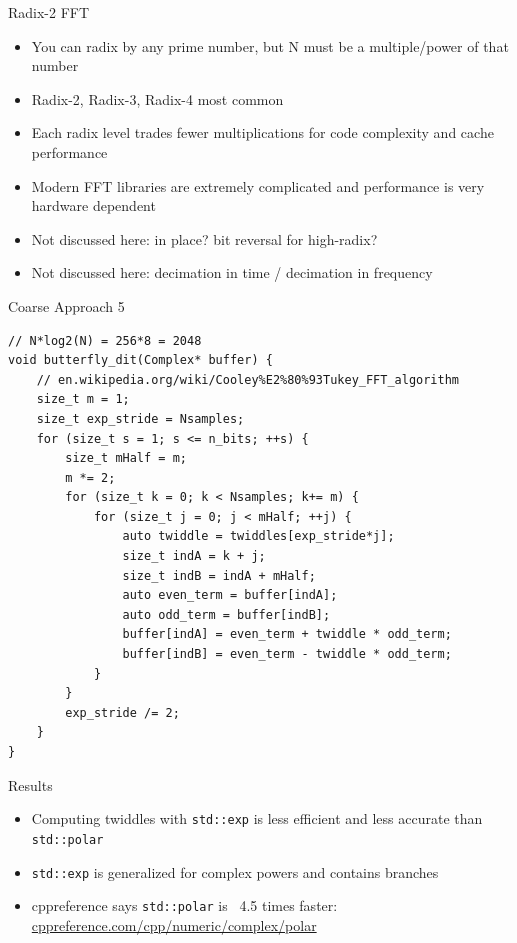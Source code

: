 \begin{frame}{Radix-2 FFT}
	\begin{itemize}
		\item You can radix by any prime number, but N must be a multiple/power of that number
		\item Radix-2, Radix-3, Radix-4 most common
		\item Each radix level trades fewer multiplications for code complexity and cache performance
		\item Modern FFT libraries are extremely complicated and performance is very hardware dependent 
		\item Not discussed here: in place? bit reversal for high-radix?
		\item Not discussed here: decimation in time / decimation in frequency
	\end{itemize}
\end{frame}

\begin{frame}[fragile]{Coarse Approach 5}
	
	\begin{lstlisting}[basicstyle=\ttfamily\scriptsize, 
		linebackgroundcolor={%
			\ifnum\value{lstnumber}=14 \color{yellow!30}\fi
			\ifnum\value{lstnumber}=15 \color{yellow!30}\fi
			\ifnum\value{lstnumber}=16 \color{yellow!30}\fi
			\ifnum\value{lstnumber}=17 \color{yellow!30}\fi
		}]
// N*log2(N) = 256*8 = 2048
void butterfly_dit(Complex* buffer) {
	// en.wikipedia.org/wiki/Cooley%E2%80%93Tukey_FFT_algorithm
	size_t m = 1;
	size_t exp_stride = Nsamples;
	for (size_t s = 1; s <= n_bits; ++s) {
		size_t mHalf = m;
		m *= 2;
		for (size_t k = 0; k < Nsamples; k+= m) {
			for (size_t j = 0; j < mHalf; ++j) {
				auto twiddle = twiddles[exp_stride*j];
				size_t indA = k + j;
				size_t indB = indA + mHalf;
				auto even_term = buffer[indA];
				auto odd_term = buffer[indB];
				buffer[indA] = even_term + twiddle * odd_term;
				buffer[indB] = even_term - twiddle * odd_term;
			}
		}
		exp_stride /= 2;
	}
}
	\end{lstlisting}
	
\end{frame}


\begin{frame}{Results}
\end{frame}


\begin{frame}
	\begin{itemize}
		\item Computing twiddles with \texttt{std::exp} is less efficient and less accurate than \texttt{std::polar}
		\item \texttt{std::exp} is generalized for complex powers and contains branches
		\item cppreference says \texttt{std::polar} is ~4.5 times faster: \href{https://cppreference.com/cpp/numeric/complex/polar}{cppreference.com/cpp/numeric/complex/polar}
	\end{itemize}
\end{frame}

\begin{frame}
\end{frame}

\begin{frame}
\end{frame}


